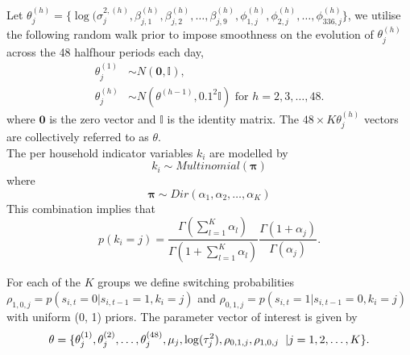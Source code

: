 \documentclass[12pt,a4paper]{article}\usepackage[]{graphicx}\usepackage[]{color}
\begin{document}
Let $\theta^{(h)}_j = \{\log(\sigma^{2, (h)}_{j}, \beta_{j, 1}^{(h)}, \beta_{j, 2}^{(h)}, \dots, \beta_{j, 9}^{(h)}, \phi_{1, j}^{(h)}, \phi_{2, j}^{(h)}, \dots, \phi_{336, j}^{(h)}\}$, we utilise the following random walk prior to impose smoothness on the evolution of $\theta^{(h)}_j$ across the 48 halfhour periods each day,
\begin{align}
\label{dynamicPrior}
\theta^{(1)}_j &\sim N(\boldsymbol{0}, \mathbb{I}), \\
\theta^{(h)}_j &\sim N(\theta^{(h-1)}, 0.1^2 \mathbb{I}) \mbox{ for } h = 2, 3, \dots, 48.
\end{align}
where $\boldsymbol{0}$ is the zero vector and $\mathbb{I}$ is the identity matrix.
The $48 \times K \theta^{(h)}_j$ vectors are collectively referred to as $\theta$.
\\

\iffalse
Each of the $K$ constant models is given by
\begin{equation}
\label{constant}
y_{i, t} = \mu_j + \epsilon_{i, t}
\end{equation}
where $\epsilon_{i, t} \sim N(0, \tau^2_{c, j})$ with the prior
\begin{equation}
\label{constantPrior}
(\mu_j, \log(\tau_j^2))^{\prime} \sim N(\boldsymbol{0}, I).
\end{equation}
We assume that the constant model is applied to times when the house is empty and thus energy consumption is invariant to factors such as temperature and day of the week.
\\
\fi

The per household indicator variables $k_i$ are modelled by
\begin{equation} 
\label{kConditional}
k_i \sim Multinomial(\boldsymbol{\pi})
\end{equation}
where 
\begin{equation}
\label{piPrior}
\boldsymbol{\pi} \sim Dir(\alpha_1, \alpha_2, \dots, \alpha_K)
\end{equation}
This combination implies that
\begin{equation}
\label{kMarginal}
p(k_i = j) = \frac{\Gamma(\sum_{l=1}^K \alpha_l)}{\Gamma(1 + \sum_{l=1}^K \alpha_l)} \frac{\Gamma(1 + \alpha_j)}{\Gamma(\alpha_j)}.
\end{equation}

\iffalse
For each of the $K$ groups we define switching probabilities $\rho_{1, 0, j} = p(s_{i, t} = 0 | s_{i, t-1} = 1, k_i = j)$ and $\rho_{0, 1, j} = p(s_{i, t} = 1 | s_{i, t-1} = 0, k_i = j)$ with uniform (0, 1) priors. The parameter vector of interest is given by 
\begin{equation}
\label{electricityTheta}
\theta = \{\theta^{(1)}_j, \theta^{(2)}_j, \dots, \theta^{(48)}_j, \mu_j, \log(\tau^2_j), \rho_{0, 1, j}, \rho_{1, 0, j} \hspace{2mm} | j = 1, 2, \dots, K\}.
\end{equation}
\end{document}
